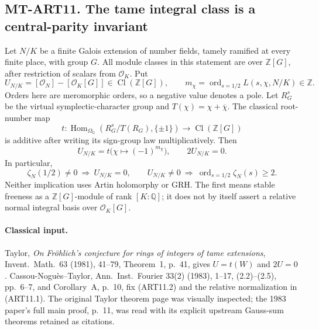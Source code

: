 \subsection*{MT-ART11. The tame integral class is a central-parity invariant}
Let $N/K$ be a finite Galois extension of number fields, tamely
ramified at every finite place, with group $G$. All module classes
in this statement are over $\mathbb Z[G]$, after restriction of
scalars from $\mathcal O_K$. Put
\[
 U_{N/K}=[\mathcal O_N]-[\mathcal O_K[G]]
       \in\operatorname{Cl}(\mathbb Z[G]),\qquad
 m_\chi=\operatorname{ord}_{s=1/2}L(s,\chi,N/K)\in\mathbb Z.
                                                        \tag{ART11.1}
\]
Orders here are meromorphic orders, so a negative value denotes
a pole. Let $R_G^s$ be the virtual symplectic-character group and
$T(\chi)=\chi+\overline\chi$. The classical root-number map
\[
 t:\operatorname{Hom}_{\Omega_{\mathbb Q}}
       (R_G^s/T(R_G),\{\pm1\})
          \longrightarrow\operatorname{Cl}(\mathbb Z[G])
                                                        \tag{ART11.2}
\]
is additive after writing its sign-group law multiplicatively.
Then
\[
 U_{N/K}=t\bigl(\chi\longmapsto(-1)^{m_\chi}\bigr),
 \qquad 2U_{N/K}=0.                                    \tag{ART11.3}
\]
In particular,
\[
 \zeta_N(1/2)\ne0\ \Longrightarrow\ U_{N/K}=0,
 \qquad
 U_{N/K}\ne0\ \Longrightarrow\
        \operatorname{ord}_{s=1/2}\zeta_N(s)\ge2.          \tag{ART11.4}
\]
Neither implication uses Artin holomorphy or GRH. The first
means stable freeness as a $\mathbb Z[G]$-module of rank
$[K:\mathbb Q]$; it does not by itself assert a relative normal
integral basis over $\mathcal O_K[G]$.

\paragraph{Classical input.}
Taylor, \emph{On Fr\"ohlich's conjecture for rings of integers
of tame extensions}, Invent.\ Math.\ 63 (1981), 41--79,
Theorem~1, p.~41, gives $U=t(W)$ and $2U=0$.
Cassou-Nogu\`es--Taylor, Ann.\ Inst.\ Fourier 33(2) (1983),
1--17, (2.2)--(2.5), pp.~6--7, and Corollary~A, p.~10,
fix (ART11.2) and the relative normalization in (ART11.1).
The original Taylor theorem page was visually inspected;
the 1983 paper's full main proof, p.~11, was read with its
explicit upstream Gauss-sum theorems retained as citations.

